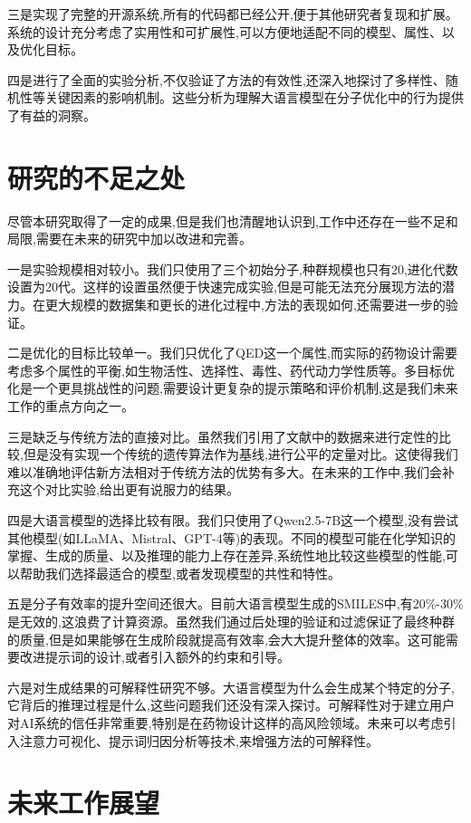 三是实现了完整的开源系统,所有的代码都已经公开,便于其他研究者复现和扩展。系统的设计充分考虑了实用性和可扩展性,可以方便地适配不同的模型、属性、以及优化目标。

四是进行了全面的实验分析,不仅验证了方法的有效性,还深入地探讨了多样性、随机性等关键因素的影响机制。这些分析为理解大语言模型在分子优化中的行为提供了有益的洞察。

\section{研究的不足之处}

尽管本研究取得了一定的成果,但是我们也清醒地认识到,工作中还存在一些不足和局限,需要在未来的研究中加以改进和完善。

一是实验规模相对较小。我们只使用了三个初始分子,种群规模也只有20,进化代数设置为20代。这样的设置虽然便于快速完成实验,但是可能无法充分展现方法的潜力。在更大规模的数据集和更长的进化过程中,方法的表现如何,还需要进一步的验证。

二是优化的目标比较单一。我们只优化了QED这一个属性,而实际的药物设计需要考虑多个属性的平衡,如生物活性、选择性、毒性、药代动力学性质等。多目标优化是一个更具挑战性的问题,需要设计更复杂的提示策略和评价机制,这是我们未来工作的重点方向之一。

三是缺乏与传统方法的直接对比。虽然我们引用了文献中的数据来进行定性的比较,但是没有实现一个传统的遗传算法作为基线,进行公平的定量对比。这使得我们难以准确地评估新方法相对于传统方法的优势有多大。在未来的工作中,我们会补充这个对比实验,给出更有说服力的结果。

四是大语言模型的选择比较有限。我们只使用了Qwen2.5-7B这一个模型,没有尝试其他模型(如LLaMA、Mistral、GPT-4等)的表现。不同的模型可能在化学知识的掌握、生成的质量、以及推理的能力上存在差异,系统性地比较这些模型的性能,可以帮助我们选择最适合的模型,或者发现模型的共性和特性。

五是分子有效率的提升空间还很大。目前大语言模型生成的SMILES中,有20\%-30\%是无效的,这浪费了计算资源。虽然我们通过后处理的验证和过滤保证了最终种群的质量,但是如果能够在生成阶段就提高有效率,会大大提升整体的效率。这可能需要改进提示词的设计,或者引入额外的约束和引导。

六是对生成结果的可解释性研究不够。大语言模型为什么会生成某个特定的分子,它背后的推理过程是什么,这些问题我们还没有深入探讨。可解释性对于建立用户对AI系统的信任非常重要,特别是在药物设计这样的高风险领域。未来可以考虑引入注意力可视化、提示词归因分析等技术,来增强方法的可解释性。

\section{未来工作展望}

